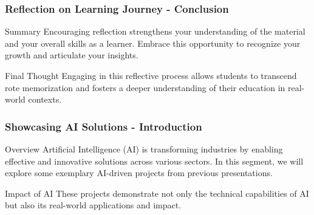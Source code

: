 \documentclass{beamer}
\begin{document}
\begin{frame}[fragile]
    \frametitle{Reflection on Learning Journey - Conclusion}
    \begin{block}{Summary}
        Encouraging reflection strengthens your understanding of the material and your overall skills as a learner.
        Embrace this opportunity to recognize your growth and articulate your insights.
    \end{block}
    \begin{block}{Final Thought}
        Engaging in this reflective process allows students to transcend rote memorization and fosters a deeper understanding of their education in real-world contexts.
    \end{block}
\end{frame}

\begin{frame}[fragile]
    \frametitle{Showcasing AI Solutions - Introduction}
    \begin{block}{Overview}
        Artificial Intelligence (AI) is transforming industries by enabling effective and innovative solutions across various sectors. In this segment, we will explore some exemplary AI-driven projects from previous presentations.
    \end{block}
    \begin{block}{Impact of AI}
        These projects demonstrate not only the technical capabilities of AI but also its real-world applications and impact.
    \end{block}
\end{frame}
\end{document}
